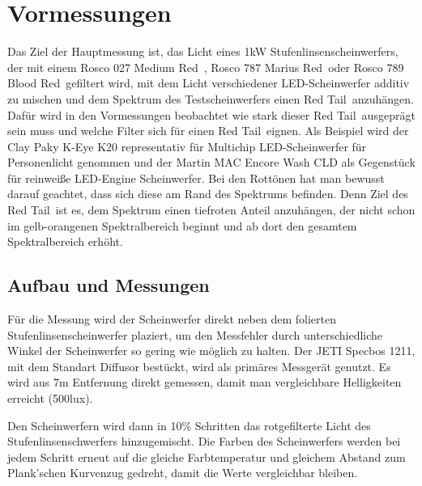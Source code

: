 \chapter{Vormessungen}

Das Ziel der Hauptmessung ist, das Licht eines 1kW Stufenlinsenscheinwerfers, der mit einem Rosco 027 \glqq Medium Red\grqq\ , Rosco 787 \glqq Marius Red\grqq\ oder Rosco 789 \glqq Blood Red\grqq\ gefiltert wird, mit dem Licht verschiedener LED-Scheinwerfer additiv zu mischen und dem Spektrum des Testscheinwerfers einen \glqq Red Tail\grqq\ anzuhängen. 
Dafür wird in den Vormessungen beobachtet wie stark dieser \glqq Red Tail\grqq\ ausgeprägt sein muss und welche Filter sich für einen \glqq Red Tail\grqq\ eignen.   
Als Beispiel wird der Clay Paky K-Eye K20 representativ für Multichip LED-Scheinwerfer für Personenlicht genommen und der Martin MAC Encore Wash CLD als Gegenstück für reinweiße LED-Engine Scheinwerfer. 
Bei den Rottönen hat man bewusst darauf geachtet, dass sich diese am Rand des Spektrums befinden. Denn Ziel des \glqq Red Tail\grqq\ ist es, dem Spektrum einen tiefroten Anteil anzuhängen, der nicht schon im gelb-orangenen Spektralbereich beginnt und ab dort den gesamtem Spektralbereich erhöht.  

\section{Aufbau und Messungen}
\label{sec_vmaum}

Für die Messung wird der Scheinwerfer direkt neben dem folierten Stufenlinsenscheinwerfer plaziert, um den Messfehler durch unterschiedliche Winkel der Scheinwerfer so gering wie möglich zu halten. Der JETI Specbos 1211, mit dem Standart Diffusor bestückt, wird als primäres Messgerät genutzt. Es wird aus 7m Entfernung direkt gemessen, damit man vergleichbare Helligkeiten erreicht (500lux). 

Den Scheinwerfern wird dann in 10\% Schritten das rotgefilterte Licht des Stufenlinsenschwerfers hinzugemischt. Die Farben des Scheinwerfers werden bei jedem Schritt erneut auf die gleiche Farbtemperatur und gleichem Abstand zum Plank'schen Kurvenzug gedreht, damit die Werte vergleichbar bleiben.


